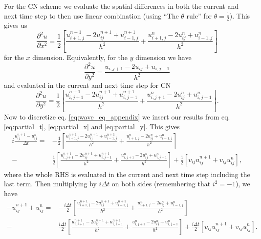 \documentclass[english,notitlepage,reprint,nofootinbib]{revtex4-1}  %
\begin{document}
For the CN scheme we evaluate the spatial differences in both the current and next time step to then use linear combination (using ``The $\theta$ rule'' \cite{compendium} for $\theta = \frac{1}{2}$). This gives us
\begin{equation}
    \frac{\partial^2 u}{\partial x^2} = \frac{1}{2} \left[ \frac{u_{i+1,j}^{n+1} -2u_{ij}^{n+1} + u_{i-1,j}^{n+1}}{h^2} 
    + \frac{u_{i+1,j}^{n} -2u_{ij}^{n} + u_{i-1,j}^{n}}{h^2} \right] \label{eq:partial_x}
\end{equation}
for the $x$ dimension. Equivalently, for the $y$ dimension we have
\begin{equation}
    \frac{\partial^2 u}{\partial y^2} = \frac{u_{i,j+1} -2u_{ij} + u_{i,j-1}}{h^2}
\end{equation}
and evaluated in the current and next time step for CN
\begin{equation}
    \frac{\partial^2 u}{\partial y^2} = \frac{1}{2} \left[ \frac{u_{i,j+1}^{n+1} -2u_{ij}^{n+1} + u_{i,j-1}^{n+1}}{h^2}
    + \frac{u_{i,j+1}^{n} -2u_{ij}^{n} + u_{i,j-1}^{n}}{h^2} \right]. \label{eq:partial_y}
\end{equation}
Now to discretize eq. \ref{eq:wave_eq_appendix} we insert our results from eq. \ref{eq:partial_t}, \ref{eq:partial_x} and \ref{eq:partial_y}. This gives
\begin{align}
    i \frac{u_{ij}^{n+1} - u_{ij}^n}{\Delta t} 
    =& - \frac{1}{2} \left[ \frac{u_{i+1,j}^{n+1} -2u_{ij}^{n+1} + u_{i-1,j}^{n+1}}{h^2} 
    + \frac{u_{i+1,j}^{n} -2u_{ij}^{n} + u_{i-1,j}^{n}}{h^2} \right] \\
     -& \frac{1}{2} \left[ \frac{u_{i,j+1}^{n+1} -2u_{ij}^{n+1} + u_{i,j-1}^{n+1}}{h^2}
     + \frac{u_{i,j+1}^{n} -2u_{ij}^{n} + u_{i,j-1}^{n}}{h^2} \right]
     + \frac{1}{2} \left[ v_{ij}u_{ij}^{n+1} + v_{ij}u_{ij}^n \right], 
\end{align}
where the whole RHS is evaluated in the current and next time step including the last term. Then multiplying by $i\Delta t$ on both sides (remembering that $i^2 = -1$), we have
\begin{align}
    - u_{ij}^{n+1} + u_{ij}^n 
    =& - \frac{i\Delta t}{2} \left[ \frac{u_{i+1,j}^{n+1} -2u_{ij}^{n+1} + u_{i-1,j}^{n+1}}{h^2} 
    + \frac{u_{i+1,j}^{n} -2u_{ij}^{n} + u_{i-1,j}^{n}}{h^2} \right] \\
     -& \frac{i\Delta t}{2} \left[ \frac{u_{i,j+1}^{n+1} -2u_{ij}^{n+1} + u_{i,j-1}^{n+1}}{h^2}
     + \frac{u_{i,j+1}^{n} -2u_{ij}^{n} + u_{i,j-1}^{n}}{h^2} \right]
     + \frac{i\Delta t}{2} \left[ v_{ij}u_{ij}^{n+1} + v_{ij}u_{ij}^n \right]. 
\end{align}
\end{document}
